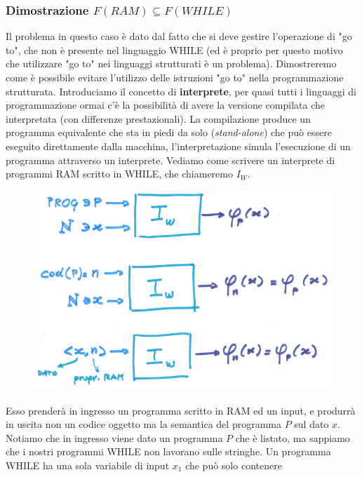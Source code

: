 \documentclass{article}
\begin{document}
\subsubsection{Dimostrazione $F(RAM)\subseteq F(WHILE)$}
Il problema in questo caso è dato dal fatto che si deve gestire l'operazione di "go to", che non
è presente nel linguaggio WHILE (ed è proprio per questo motivo che utilizzare
"go to" nei linguaggi strutturati è un problema). Dimostreremo come è possibile evitare l'utilizzo
delle istruzioni "go to" nella programmazione strutturata.
\newline\newline
Introduciamo il concetto di \textbf{interprete}, per quasi tutti i linguaggi di programmazione
ormai c'è la possibilità di avere la versione compilata che interpretata
(con differenze prestazionali).
La compilazione produce un programma equivalente che sta in piedi da solo (\textit{stand-alone})
che può essere eseguito direttamente dalla macchina, l'interpretazione simula l'esecuzione
di un programma attraverso un interprete.
\newline\newline
Vediamo come scrivere un interprete di programmi RAM scritto in WHILE, che chiameremo $I_W$.
\begin{figure}[H]
    \centering
    \includegraphics[scale=0.4]{images/interprete_while.png}
\end{figure}
Esso prenderà in ingresso un programma scritto in RAM ed un input, e produrrà in uscita
non un codice oggetto ma la semantica del programma $P$ sul dato $x$. Notiamo che in ingresso
viene dato un programma $P$ che è listato, ma sappiamo che i nostri programmi WHILE non lavorano
sulle stringhe. Un programma WHILE ha una sola variabile di input $x_1$ che può solo contenere
\end{document}
